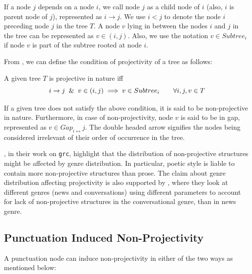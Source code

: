If a node \(j\) depends on a node \(i\), we call node \(j\) as a child node of \(i\) (also, \(i\) is parent node of \(j\)), represented as \(i \xrightarrow{} j\). We use \(i < j\) to denote the node \(i\) preceding node \(j\) in the tree \(T\). A node \(v\) lying in between the nodes \(i\) and \(j\) in the tree can be represented as \(v \in (i,j)\). Also, we use the notation \(v \in Subtree_{i}\) if node \(v\) is part of the subtree rooted at node \(i\). 

From \cite{Havelka}, we can define the condition of projectivity of a tree as follows:

\theoremstyle{definition}
\begin{definition}
\label{def:projectivity}
A given tree \(T\) is projective in nature iff
\begin{equation}
\label{eqn:projectivity}
    i \xrightarrow{} j \And v \in (i, j) \implies v \in Subtree_{i} \qquad \forall i, j, v \in T 
\end{equation}

If a given tree does not satisfy the above condition, it is said to be non-projective in nature. Furthermore, in case of non-projectivity, node \(v\) is said to be in gap, represented as \(v \in Gap_{i\leftrightarrow}j\). The double headed arrow signifies the nodes being considered irrelevant of their order of occurrence in the tree.
\end{definition}

\cite{mambriniNonProj}, in their work on \verb|grc|, highlight that the distribution of non-projective structures might be affected by genre distribution. In particular, poetic style is liable to contain more non-projective structures than prose. The claim about genre distribution affecting projectivity is also supported by \cite{nonprojgenre}, where they look at different genres (news and conversations) using different parameters to account for lack of non-projective structures in the conversational genre, than in news genre. %

\subsection{Punctuation Induced Non-Projectivity}
\label{ssec:punct-nonproj}

A punctuation node can induce non-projectivity in either of the two ways as mentioned below:

